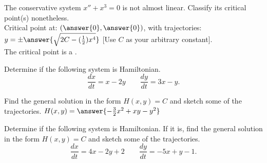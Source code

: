 \documentclass{ximera}
\begin{document}


\begin{exercise}%
    The conservative system $x''+x^3 = 0$ is not almost linear.  Classify its critical point(s) nonetheless.\\
    Critical point at: $\left(\answer{0}, \answer{0}\right)$, with trajectories: $y = \pm \answer{\sqrt{2C-(\frac{1}{2})x^4}}$ [Use $C$ as your arbitrary constant].\\
    The critical point is a  .
\end{exercise}

\begin{exercise}
    Determine if the following system is Hamiltonian. 
    \[ 
        \frac{dx}{dt} = x - 2y \qquad \frac{dy}{dt} = 3x - y.
    \]
    \begin{multipleChoice}
    \end{multipleChoice}
    \begin{problem}
        Find the general solution in the form $H(x,y) = C$ and sketch some of the trajectories. $H(x,y) = \answer{-\frac{3}{2}x^2 + xy - y^2}$
    \end{problem}
\end{exercise}

\begin{exercise}
    Determine if the following system is Hamiltonian. If it is, find the general solution in the form $H(x,y) = C$ and sketch some of the trajectories.
    \[ 
        \frac{dx}{dt} = 4x - 2y + 2 \qquad \frac{dy}{dt} = -5x + y - 1.
    \]
    \begin{multipleChoice}
    \end{multipleChoice}
\end{exercise}
\end{document}
